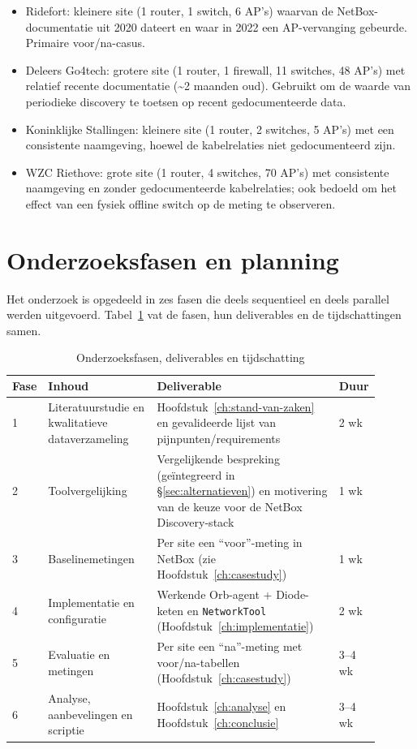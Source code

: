 \begin{itemize}
  \item Ridefort: kleinere site (1 router, 1 switch, 6 AP's) waarvan de NetBox-documentatie uit 2020 dateert en waar in 2022 een AP-vervanging gebeurde. Primaire voor/na-casus.
  \item Deleers Go4tech: grotere site (1 router, 1 firewall, 11 switches, 48 AP's) met relatief recente documentatie (\textasciitilde{}2 maanden oud). Gebruikt om de waarde van periodieke discovery te toetsen op recent gedocumenteerde data.
  \item Koninklijke Stallingen: kleinere site (1 router, 2 switches, 5 AP's) met een consistente naamgeving, hoewel de kabelrelaties niet gedocumenteerd zijn.
  \item WZC Riethove: grote site (1 router, 4 switches, 70 AP's) met consistente naamgeving en zonder gedocumenteerde kabelrelaties; ook bedoeld om het effect van een fysiek offline switch op de meting te observeren.
\end{itemize}

\section{Onderzoeksfasen en planning}

Het onderzoek is opgedeeld in zes fasen die deels sequentieel en deels parallel werden uitgevoerd. Tabel~\ref{tab:fasen-planning} vat de fasen, hun deliverables en de tijdschattingen samen.

\begin{table}[H]
  \centering
  \caption[Onderzoeksfasen, deliverables en tijdschatting]{Onderzoeksfasen, deliverables en tijdschatting}
  \label{tab:fasen-planning}
  \footnotesize
  \begin{tabular}{p{0.04\linewidth} p{0.30\linewidth} p{0.50\linewidth} p{0.06\linewidth}}
    \toprule
    \textbf{Fase} & \textbf{Inhoud} & \textbf{Deliverable} & \textbf{Duur} \\
    \midrule
    1 & Literatuurstudie en kwalitatieve dataverzameling & Hoofdstuk~\ref{ch:stand-van-zaken} en gevalideerde lijst van pijnpunten/requirements & 2 wk \\
    2 & Toolvergelijking & Vergelijkende bespreking (geïntegreerd in \S\ref{sec:alternatieven}) en motivering van de keuze voor de NetBox Discovery-stack & 1 wk \\
    3 & Baselinemetingen & Per site een ``voor''-meting in NetBox (zie Hoofdstuk~\ref{ch:casestudy}) & 1 wk \\
    4 & Implementatie en configuratie & Werkende Orb-agent + Diode-keten en \texttt{NetworkTool} (Hoofdstuk~\ref{ch:implementatie}) & 2 wk \\
    5 & Evaluatie en metingen & Per site een ``na''-meting met voor/na-tabellen (Hoofdstuk~\ref{ch:casestudy}) & 3--4 wk \\
    6 & Analyse, aanbevelingen en scriptie & Hoofdstuk~\ref{ch:analyse} en Hoofdstuk~\ref{ch:conclusie} & 3--4 wk \\
    \bottomrule
  \end{tabular}
\end{table}

